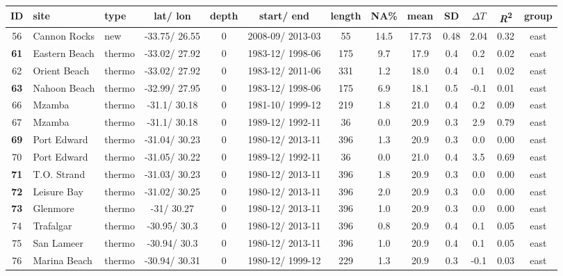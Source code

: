\documentclass{ametsoc}
\begin{document}
\begin{table}[ht]
\label{metadata-east-table}
\centering
\tiny
\begin{tabular}{cllcccccccccc}
\hline
 ID & site & type & lat/ lon & depth & start/ end & length & NA\% & mean & SD & $\Delta T$ & \emph{R}\textsuperscript{2} & group \\ \hline
   56 & Cannon Rocks & new & -33.75/ 26.55 &   0 & 2008-09/ 2013-03 &  55 & 14.5 & 17.73 & 0.48 & 2.04 & 0.32 & east \\
   \textbf{61} & Eastern Beach & thermo & -33.02/ 27.92 &   0 & 1983-12/ 1998-06 & 175 & 9.7 & 17.9 & 0.4 & 0.2 & 0.02 & east \\
   62 & Orient Beach & thermo & -33.02/ 27.92 &   0 & 1983-12/ 2011-06 & 331 & 1.2 & 18.0 & 0.4 & 0.1 & 0.02 & east \\
   \textbf{63} & Nahoon Beach & thermo & -32.99/ 27.95 &   0 & 1983-12/ 1998-06 & 175 & 6.9 & 18.1 & 0.5 & -0.1 & 0.01 & east \\
   66 & Mzamba & thermo & -31.1/ 30.18 &   0 & 1981-10/ 1999-12 & 219 & 1.8 & 21.0 & 0.4 & 0.2 & 0.09 & east \\
   67 & Mzamba & thermo & -31.1/ 30.18 &   0 & 1989-12/ 1992-11 &  36 & 0.0 & 20.9 & 0.3 & 2.9 & 0.79 & east \\
   \textbf{69} & Port Edward & thermo & -31.04/ 30.23 &   0 & 1980-12/ 2013-11 & 396 & 1.3 & 20.9 & 0.3 & 0.0 & 0.00 & east \\
   70 & Port Edward & thermo & -31.05/ 30.22 &   0 & 1989-12/ 1992-11 &  36 & 0.0 & 21.0 & 0.4 & 3.5 & 0.69 & east \\
   \textbf{71} & T.O. Strand & thermo & -31.03/ 30.23 &   0 & 1980-12/ 2013-11 & 396 & 1.8 & 20.9 & 0.3 & 0.0 & 0.00 & east \\
   \textbf{72} & Leisure Bay & thermo & -31.02/ 30.25 &   0 & 1980-12/ 2013-11 & 396 & 2.0 & 20.9 & 0.3 & 0.0 & 0.00 & east \\
   \textbf{73} & Glenmore & thermo & -31/ 30.27 &   0 & 1980-12/ 2013-11 & 396 & 1.0 & 20.9 & 0.3 & 0.0 & 0.00 & east \\
   74 & Trafalgar & thermo & -30.95/ 30.3 &   0 & 1980-12/ 2013-11 & 396 & 0.8 & 20.9 & 0.4 & 0.1 & 0.05 & east \\
   75 & San Lameer & thermo & -30.94/ 30.3 &   0 & 1980-12/ 2013-11 & 396 & 1.0 & 20.9 & 0.4 & 0.1 & 0.05 & east \\
   76 & Marina Beach & thermo & -30.94/ 30.31 &   0 & 1980-12/ 1999-12 & 229 & 1.3 & 20.9 & 0.3 & -0.1 & 0.03 & east \\

\end{tabular}
\end{table}
\end{document}
